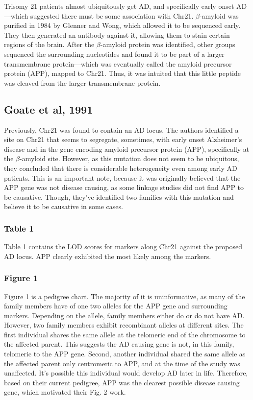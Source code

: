 \documentclass[12pt]{report}
\begin{document}
Trisomy 21 patients almost ubiquitously get AD, and specifically early onset AD---which suggested there must be some association with Chr21. $\beta$-amyloid was purified in 1984 by Glenner and Wong, which allowed it to be sequenced early. They then generated an antibody against it, allowing them to stain certain regions of the brain. After the $\beta$-amyloid protein was identified, other groups sequenced the surrounding nucleotides and found it to be part of a larger transmembrane protein---which was eventually called the amyloid precursor protein (APP), mapped to Chr21. Thus, it was intuited that this little peptide was cleaved from the larger transmembrane protein. 


\subsection*{Goate et al, 1991} Previously, Chr21 was found to contain an AD locus. The authors identified a site on Chr21 that seems to segregate, sometimes, with early onset Alzheimer's disease and in the gene encoding amyloid precursor protein (APP), specifically at the $\beta$-amyloid site. However, as this mutation does not seem to be ubiquitous, they concluded that there is considerable heterogeneity even among early AD patients. This is an important note, because it was originally believed that the APP gene was not disease causing, as some linkage studies did not find APP to be causative. Though, they've identified two families with this mutation and believe it to be causative in some cases.\newline


\subsubsection*{Table 1} Table 1 contains the LOD scores for markers along Chr21 against the proposed AD locus. APP clearly exhibited the most likely among the markers. 

\subsubsection*{Figure 1} Figure 1 is a pedigree chart. The majority of it is uninformative, as many of the family members have of one two alleles for the APP gene and surrounding markers. Depending on the allele, family members either do or do not have AD. However, two family members exhibit recombinant alleles at different sites. The first individual shares the same allele at the telomeric end of the chromosome to the affected parent. This suggests the AD causing gene is not, in this family, telomeric to the APP gene. Second, another individual shared the same allele as the affected parent only centromeric to APP, and at the time of the study was unaffected. It's possible this individual would develop AD later in life. Therefore, based on their current pedigree, APP was the clearest possible disease causing gene, which motivated their Fig. 2 work. 
\end{document}
